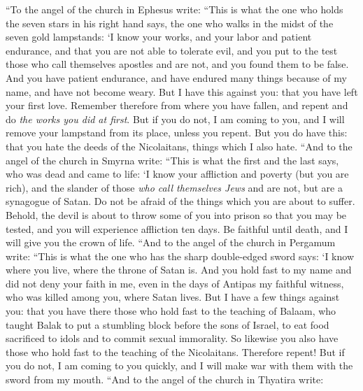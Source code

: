 \begin{biblechapter} %
 “To the angel of the church in Ephesus write:
\verse “This is what the one who holds the seven stars in his right hand says, the one who walks in the midst of the seven gold lampstands:
\verse ‘I know your works, and your labor and patient endurance, and that you are not able to tolerate evil, and you put to the test those who call themselves apostles and are not, and you found them to be false.
\verse And you have patient endurance, and have endured many things because of my name, and have not become weary.
\verse But I have this against you: that you have left your first love.
\verse Remember therefore from where you have fallen, and repent and do \textit{the works you did at first}. But if you do not, I am coming to you, and I will remove your lampstand from its place, unless you repent.
\verse But you do have this: that you hate the deeds of the Nicolaitans, things which I also hate.
 “And to the angel of the church in Smyrna write:
\verse “This is what the first and the last says, who was dead and came to life:
\verse ‘I know your affliction and poverty (but you are rich), and the slander of those \textit{who call themselves Jews} and are not, but are a synagogue of Satan.
\verse Do not be afraid of the things which you are about to suffer. Behold, the devil is about to throw some of you into prison so that you may be tested, and you will experience affliction ten days. Be faithful until death, and I will give you the crown of life.
 “And to the angel of the church in Pergamum write:
\verse “This is what the one who has the sharp double-edged sword says:
\verse ‘I know where you live, where the throne of Satan is. And you hold fast to my name and did not deny your faith in me, even in the days of Antipas my faithful witness, who was killed among you, where Satan lives.
\verse But I have a few things against you: that you have there those who hold fast to the teaching of Balaam, who taught Balak to put a stumbling block before the sons of Israel, to eat food sacrificed to idols and to commit sexual immorality.
\verse So likewise you also have those who hold fast to the teaching of the Nicolaitans.
\verse Therefore repent! But if you do not, I am coming to you quickly, and I will make war with them with the sword from my mouth.
 “And to the angel of the church in Thyatira write:

\end{biblechapter}
